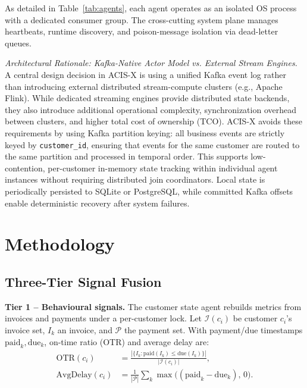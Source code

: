 \documentclass[conference]{IEEEtran}
\begin{document}
As detailed in Table~\ref{tab:agents}, each agent operates as an isolated OS process with a dedicated consumer group. The cross-cutting system plane manages heartbeats, runtime discovery, and poison-message isolation via dead-letter queues.

\noindent\textit{Architectural Rationale: Kafka-Native Actor Model vs. External Stream Engines.} A central design decision in ACIS-X is using a unified Kafka event log rather than introducing external distributed stream-compute clusters (e.g., Apache Flink). While dedicated streaming engines provide distributed state backends, they also introduce additional operational complexity, synchronization overhead between clusters, and higher total cost of ownership (TCO). ACIS-X avoids these requirements by using Kafka partition keying: all business events are strictly keyed by \texttt{customer\_id}, ensuring that events for the same customer are routed to the same partition and processed in temporal order. This supports low-contention, per-customer in-memory state tracking within individual agent instances without requiring distributed join coordinators. Local state is periodically persisted to SQLite or PostgreSQL, while committed Kafka offsets enable deterministic recovery after system failures.

\section{Methodology}
\label{sec:methodology}

\subsection{Three-Tier Signal Fusion}

\textbf{Tier 1 -- Behavioural signals.} The customer state agent rebuilds metrics from invoices and payments under a per-customer lock. Let $\mathcal{I}(c_i)$ be customer $c_i$'s invoice set, $I_k$ an invoice, and $\mathcal{P}$ the payment set. With payment/due timestamps $\mathrm{paid}_k, \mathrm{due}_k$, on-time ratio (OTR) and average delay are:
\begin{equation}
\begin{split}
\mathrm{OTR}(c_i) &= \frac{|\{I_k : \mathrm{paid}(I_k)\leq\mathrm{due}(I_k)\}|}{|\mathcal{I}(c_i)|}, \\
\mathrm{AvgDelay}(c_i) &= \frac{1}{|\mathcal{P}|}\sum_{k}\max\bigl((\mathrm{paid}_k - \mathrm{due}_k),\,0\bigr).
\end{split}
\label{eq:behavioural}
\end{equation}
\end{document}
